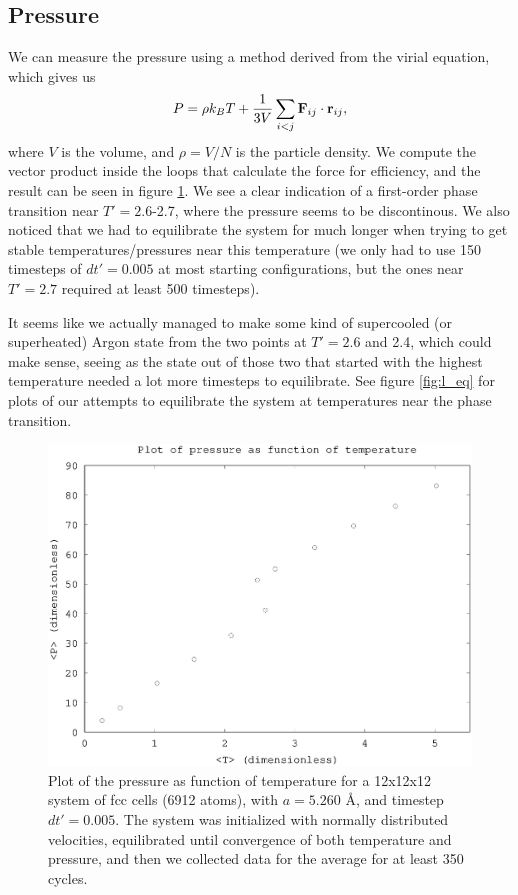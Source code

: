 \subsection*{Pressure}
We can measure the pressure using a method derived from the virial equation, which gives us
\[
    P = \rho k_B T + \frac{1}{3V}\sum_{i<j} \mathbf{F}_{ij} \cdot \mathbf{r}_{ij},
\]
where $V$ is the volume, and $\rho = V/N$ is the particle density. We compute the vector product inside the loops that calculate the force for efficiency, and the result can be seen in figure \ref{fig:l}. We see a clear indication of a first-order phase transition near $T' = 2.6$-2.7, where the pressure seems to be discontinous. We also noticed that we had to equilibrate the system for much longer when trying to get stable temperatures/pressures near this temperature (we only had to use 150 timesteps of $dt' = 0.005$ at most starting configurations, but the ones near $T' = 2.7$ required at least 500 timesteps).

It seems like we actually managed to make some kind of supercooled (or superheated) Argon state from the two points at $T' = 2.6$ and 2.4, which could make sense, seeing as the state out of those two that started with the highest temperature needed a lot more timesteps to equilibrate. See figure \ref{fig:l_eq} for plots of our attempts to equilibrate the system at temperatures near the phase 
transition.
\begin{figure}[h!]
    \centering
    \includegraphics[width =.70\textwidth]{bilder/l_plot01_2.eps}
    \parbox{4in} {
        \caption{
            \small{
                Plot of the pressure as function of temperature for a 12x12x12 system of fcc cells (6912 atoms), with $a = 5.260$ \AA, and timestep $dt' = 0.005$. The system was initialized with normally distributed velocities, equilibrated until convergence of both temperature and pressure, and then we collected data for the average for at least 350 cycles.
            }
            \label{fig:l}
        }
    }
\end{figure}

